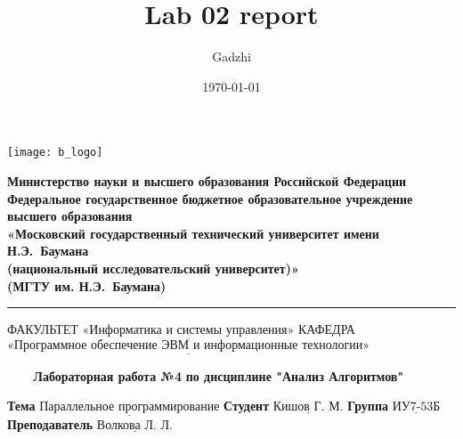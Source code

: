 

\title{Lab 02 report}
\author{Gadzhi}

\date{\today}


\thispagestyle{empty}

\noindent \begin{minipage}{0.15\textwidth}
	\texttt{[image: b\_logo]}
\end{minipage}
\noindent\begin{minipage}{0.85\textwidth}\centering
	\textbf{Министерство науки и высшего образования Российской Федерации}\\
	\textbf{Федеральное государственное бюджетное образовательное учреждение высшего образования}\\
	\textbf{«Московский государственный технический университет имени Н.Э.~Баумана}\\
	\textbf{(национальный исследовательский университет)»}\\
	\textbf{(МГТУ им. Н.Э.~Баумана)}
\end{minipage}

\noindent\rule{16cm}{3pt}
\newline\newline
\noindent ФАКУЛЬТЕТ $\underline{\text{«Информатика и системы управления»}}$ \newline\newline
\noindent КАФЕДРА $\underline{\text{«Программное обеспечение ЭВМ и информационные технологии»}}$\newline


\begin{center}
	\noindent\begin{minipage}{1.3\textwidth}\centering
	\Large\textbf{   ~~~ Лабораторная работа №4}\newline
	\textbf{по дисциплине "Анализ Алгоритмов"}\newline\newline\newline
	\end{minipage}
\end{center}

\noindent\textbf{Тема} $\underline{\text{Параллельное программирование}}$\newline\newline
\noindent\textbf{Студент} $\underline{\text{Кишов Г. М.}}$\newline\newline
\noindent\textbf{Группа} $\underline{\text{ИУ7-53Б}}$\newline\newline
\noindent\textbf{Преподаватель} $\underline{\text{Волкова Л. Л.}}$\newline

